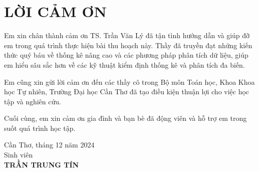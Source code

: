 \chapter*{LỜI CẢM ƠN}

Em xin chân thành cảm ơn TS. Trần Văn Lý đã tận tình hướng dẫn và giúp đỡ em trong quá trình thực hiện bài thu hoạch này. Thầy đã truyền đạt những kiến thức quý báu về thống kê nâng cao và các phương pháp phân tích dữ liệu, giúp em hiểu sâu sắc hơn về các kỹ thuật kiểm định thống kê và phân tích đa biến.

Em cũng xin gửi lời cảm ơn đến các thầy cô trong Bộ môn Toán học, Khoa Khoa học Tự nhiên, Trường Đại học Cần Thơ đã tạo điều kiện thuận lợi cho việc học tập và nghiên cứu.

Cuối cùng, em xin cảm ơn gia đình và bạn bè đã động viên và hỗ trợ em trong suốt quá trình học tập.

\vspace{2cm}
\hfill\begin{minipage}{6cm}
\centering
Cần Thơ, tháng 12 năm 2024\\
Sinh viên\\[2ex]
\textbf{TRẦN TRUNG TÍN}
\end{minipage}
